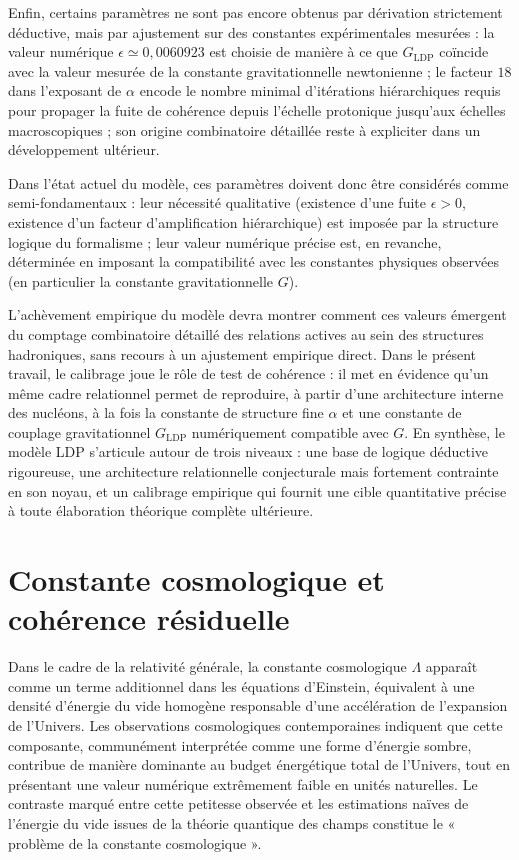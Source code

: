 \documentclass[11pt,a4paper]{article}
\begin{document}
Enfin, certains paramètres ne sont pas encore obtenus par dérivation strictement déductive, mais par ajustement sur des constantes expérimentales mesurées :  
la valeur numérique \(\epsilon \simeq 0{,}0060923\) est choisie de manière à ce que \(G_{\mathrm{LDP}}\) coïncide avec la valeur mesurée de la constante gravitationnelle newtonienne ;  
le facteur \(18\) dans l’exposant de \(\alpha\) encode le nombre minimal d’itérations hiérarchiques requis pour propager la fuite de cohérence depuis l’échelle protonique jusqu’aux échelles macroscopiques ; son origine combinatoire détaillée reste à expliciter dans un développement ultérieur.

Dans l’état actuel du modèle, ces paramètres doivent donc être considérés comme semi-fondamentaux :  
leur nécessité qualitative (existence d’une fuite \(\epsilon > 0\), existence d’un facteur d’amplification hiérarchique) est imposée par la structure logique du formalisme ;  
leur valeur numérique précise est, en revanche, déterminée en imposant la compatibilité avec les constantes physiques observées (en particulier la constante gravitationnelle \(G\)).

L’achèvement empirique du modèle devra montrer comment ces valeurs émergent du comptage combinatoire détaillé des relations actives au sein des structures hadroniques, sans recours à un ajustement empirique direct. Dans le présent travail, le calibrage joue le rôle de test de cohérence : il met en évidence qu’un même cadre relationnel permet de reproduire, à partir d’une architecture interne des nucléons, à la fois la constante de structure fine \(\alpha\) et une constante de couplage gravitationnel \(G_{\mathrm{LDP}}\) numériquement compatible avec \(G\). En synthèse, le modèle LDP s’articule autour de trois niveaux : une base de logique déductive rigoureuse, une architecture relationnelle conjecturale mais fortement contrainte en son noyau, et un calibrage empirique qui fournit une cible quantitative précise à toute élaboration théorique complète ultérieure.

\section{Constante cosmologique et cohérence résiduelle}

Dans le cadre de la relativité générale, la constante cosmologique \(\Lambda\) apparaît comme un terme additionnel dans les équations d’Einstein, équivalent à une densité d’énergie du vide homogène responsable d’une accélération de l’expansion de l’Univers. Les observations cosmologiques contemporaines indiquent que cette composante, communément interprétée comme une forme d’énergie sombre, contribue de manière dominante au budget énergétique total de l’Univers, tout en présentant une valeur numérique extrêmement faible en unités naturelles. Le contraste marqué entre cette petitesse observée et les estimations naïves de l’énergie du vide issues de la théorie quantique des champs constitue le « problème de la constante cosmologique ». 
\end{document}
